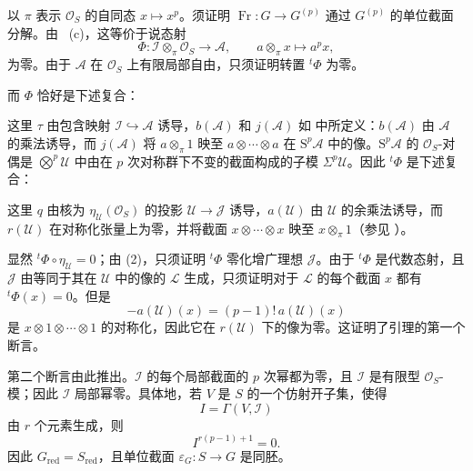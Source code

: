 以 \(\pi\) 表示 \(\mathcal O_S\) 的自同态 \(x\mapsto x^p\)。须证明 \(\operatorname{Fr}:G\to G^{(p)}\) 通过 \(G^{(p)}\) 的单位截面分解。由 ~(c)，这等价于说态射
\[
  \Phi:
  \mathcal I\otimes_{\pi}\mathcal O_S
  \longrightarrow
  \mathcal A,
  \qquad
  a\otimes_{\pi}x\longmapsto a^p x,
\]
为零。由于 \(\mathcal A\) 在 \(\mathcal O_S\) 上有限局部自由，只须证明转置 \({}^{t}\Phi\) 为零。

而 \(\Phi\) 恰好是下述复合：
\begin{center}
  \label{sga3:VIIA:7.2-frobenius-phi-composite}
  
\end{center}
这里 \(\tau\) 由包含映射 \(\mathcal I\hookrightarrow\mathcal A\) 诱导，\(b(\mathcal A)\) 和 \(j(\mathcal A)\) 如  中所定义：\(b(\mathcal A)\) 由 \(\mathcal A\) 的乘法诱导，而 \(j(\mathcal A)\) 将 \(a\otimes_{\pi}1\) 映至 \(a\otimes\cdots\otimes a\) 在 \(\mathrm S^p\mathcal A\) 中的像。\(\mathrm S^p\mathcal A\) 的 \(\mathcal O_S\)-对偶是 \(\bigotimes^p\mathcal U\) 中由在 \(p\) 次对称群下不变的截面构成的子模 \(\Sigma^p\mathcal U\)。因此 \({}^{t}\Phi\) 是下述复合：
\begin{center}
  \label{sga3:VIIA:7.2-transposed-phi-composite}
  
\end{center}
这里 \(q\) 由核为 \(\eta_{\mathcal U}(\mathcal O_S)\) 的投影 \(\mathcal U\to\mathcal J\) 诱导，\(a(\mathcal U)\) 由 \(\mathcal U\) 的余乘法诱导，而 \(r(\mathcal U)\) 在对称化张量上为零，并将截面 \(x\otimes\cdots\otimes x\) 映至 \(x\otimes_{\pi}1\)（参见 ）。

显然 \({}^{t}\Phi\circ\eta_{\mathcal U}=0\)；由 (2)，只须证明 \({}^{t}\Phi\) 零化增广理想 \(\mathcal J\)。由于 \({}^{t}\Phi\) 是代数态射，且 \(\mathcal J\) 由等同于其在 \(\mathcal U\) 中的像的 \(\mathcal L\) 生成，只须证明对于 \(\mathcal L\) 的每个截面 \(x\) 都有 \({}^{t}\Phi(x)=0\)。但是
\[
  -a(\mathcal U)(x)=(p-1)!\,a(\mathcal U)(x)
\]
是 \(x\otimes1\otimes\cdots\otimes1\) 的对称化，因此它在 \(r(\mathcal U)\) 下的像为零。这证明了引理的第一个断言。

第二个断言由此推出。\(\mathcal I\) 的每个局部截面的 \(p\) 次幂都为零，且 \(\mathcal I\) 是有限型 \(\mathcal O_S\)-模；因此 \(\mathcal I\) 局部幂零。具体地，若 \(V\) 是 \(S\) 的一个仿射开子集，使得
\[
  I=\Gamma(V,\mathcal I)
\]
由 \(r\) 个元素生成，则
\[
  I^{r(p-1)+1}=0.
\]
因此 \(G_{\mathrm{red}}=S_{\mathrm{red}}\)，且单位截面 \(\varepsilon_G:S\to G\) 是同胚。

